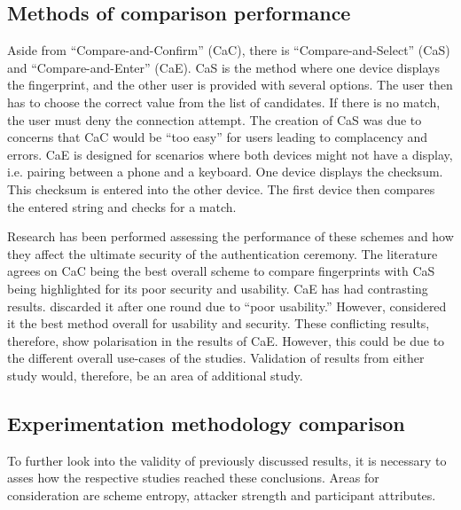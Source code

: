 \subsection*{Methods of comparison performance}
Aside 
from ``Compare-and-Confirm'' (CaC), there is ``Compare-and-Select'' (CaS) and ``Compare-and-Enter'' (CaE). CaS is the method where one device displays the fingerprint, and the other user is provided with several options. The user then has to choose the correct value from the list of candidates. If there is no match, the user must deny the connection attempt. The creation of CaS was due to concerns that CaC would be ``too easy'' for users leading to complacency and errors\cite{uzun2007usability}. CaE is designed for scenarios where both devices might not have a display, i.e. pairing between a phone and a keyboard. One device displays the checksum. This checksum is entered into the other device. The first device then compares the entered string and checks for a match.

Research has been performed assessing the performance of these schemes and how they affect the ultimate security of the authentication ceremony. The literature agrees on CaC being the best overall scheme to compare fingerprints \cite{tan2017can}\cite{uzun2007usability} with CaS being highlighted for its poor security and usability. CaE has  had contrasting results. \cite{uzun2007usability} discarded it after one round due to ``poor usability.'' However, \cite{tan2017can} considered it the best method overall for usability and security. These conflicting results, therefore, show polarisation in the results of CaE. However, this could be due to the different overall use-cases of the studies. Validation of results from either study would, therefore, be an area of additional study.


\subsection*{Experimentation methodology comparison}
To further look into the validity of previously discussed results, it is necessary to asses how the respective studies reached these conclusions. Areas for consideration are scheme entropy, attacker strength and participant attributes.

